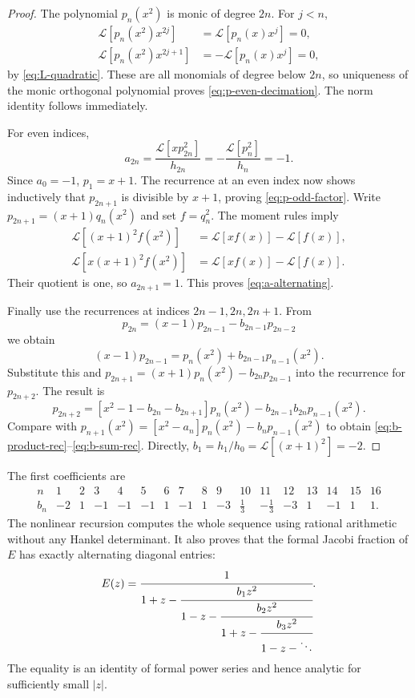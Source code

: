 \documentclass[11pt]{article}
\theoremstyle{definition}
\theoremstyle{remark}
\newcommand{\cL}{\mathcal L}
\begin{document}
\begin{proof}
The polynomial \(p_n(x^2)\) is monic of degree \(2n\).  For \(j<n\),
\begin{align*}
 \cL[p_n(x^2)x^{2j}]&=\cL[p_n(x)x^j]=0,\\
 \cL[p_n(x^2)x^{2j+1}]&=-\cL[p_n(x)x^j]=0,
\end{align*}
by \eqref{eq:L-quadratic}.  These are all monomials of degree below \(2n\), so uniqueness
of the monic orthogonal polynomial proves \eqref{eq:p-even-decimation}.  The norm identity
follows immediately.

For even indices,
\[
 a_{2n}=\frac{\cL[xp_{2n}^2]}{h_{2n}}
 =-\frac{\cL[p_n^2]}{h_n}=-1.
\]
Since \(a_0=-1\), \(p_1=x+1\).  The recurrence at an even index now shows inductively that
\(p_{2n+1}\) is divisible by \(x+1\), proving \eqref{eq:p-odd-factor}.
Write \(p_{2n+1}=(x+1)q_n(x^2)\) and set \(f=q_n^2\).  The moment rules imply
\begin{align*}
 \cL[(x+1)^2f(x^2)]
 &=\cL[xf(x)]-\cL[f(x)],\\
 \cL[x(x+1)^2f(x^2)]
 &=\cL[xf(x)]-\cL[f(x)].
\end{align*}
Their quotient is one, so \(a_{2n+1}=1\).  This proves
\eqref{eq:a-alternating}.

Finally use the recurrences at indices \(2n-1,2n,2n+1\).  From
\[
 p_{2n}=(x-1)p_{2n-1}-b_{2n-1}p_{2n-2}
\]
we obtain
\[
 (x-1)p_{2n-1}=p_n(x^2)+b_{2n-1}p_{n-1}(x^2).
\]
Substitute this and
\(
 p_{2n+1}=(x+1)p_n(x^2)-b_{2n}p_{2n-1}
\)
into the recurrence for \(p_{2n+2}\).  The result is
\[
 p_{2n+2}
 =[x^2-1-b_{2n}-b_{2n+1}]p_n(x^2)
 -b_{2n-1}b_{2n}p_{n-1}(x^2).
\]
Compare with
\(
 p_{n+1}(x^2)=[x^2-a_n]p_n(x^2)-b_np_{n-1}(x^2)
\)
to obtain \eqref{eq:b-product-rec}--\eqref{eq:b-sum-rec}.  Directly,
\(b_1=h_1/h_0=\cL[(x+1)^2]=-2\).
\end{proof}

The first coefficients are
\begin{equation}
\begin{array}{c|rrrrrrrrrrrrrrrr}
 n&1&2&3&4&5&6&7&8&9&10&11&12&13&14&15&16\\ \hline
 b_n&-2&1&-1&-1&-1&1&-1&1&-3&\frac13&-\frac13&-3&1&-1&1&1.
\end{array}                                                  \label{eq:b-first-row}
\end{equation}
The nonlinear recursion computes the whole sequence using rational arithmetic without any
Hankel determinant.  It also proves that the formal Jacobi fraction of \(E\) has exactly
alternating diagonal entries:
\begin{equation}
 E(z)=\cfrac{1}{1+z-
 \cfrac{b_1z^2}{1-z-
 \cfrac{b_2z^2}{1+z-
 \cfrac{b_3z^2}{1-z-\ddots}}}}.                            \label{eq:E-J-fraction}
\end{equation}
The equality is an identity of formal power series and hence analytic for sufficiently small
\(|z|\).
\end{document}
